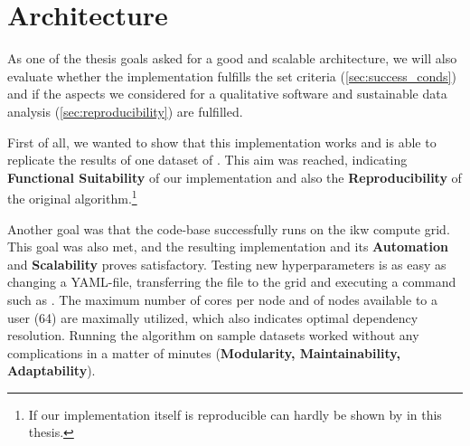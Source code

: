












\section{Architecture}

As one of the thesis goals asked for a good and scalable architecture, we will also evaluate whether the implementation fulfills the set criteria (\autoref{sec:success_conds}) and if the aspects we considered for a qualitative software and sustainable data analysis (\autoref{sec:reproducibility}) are fulfilled.

First of all, we wanted to show that this implementation works and is able to replicate the results of one dataset of \mainalgos. This aim was reached, indicating \textbf{Functional Suitability} of our implementation and also the \textbf{Reproducibility} of the original algorithm.\footnote{If our implementation itself is reproducible can hardly be shown by \me in this thesis.}

Another goal was that the code-base successfully runs on the \gls{ikw} compute grid. This goal was also met, and the resulting implementation and its \textbf{Automation} and \textbf{Scalability} proves satisfactory. Testing new hyperparameters is as easy as changing a YAML-file, transferring the file to the grid and executing a command such as . The maximum number of cores per node and of nodes available to a user (64) are maximally utilized, which also indicates optimal dependency resolution. Running the algorithm on sample datasets worked without any complications in a matter of minutes (\textbf{Modularity, Maintainability, Adaptability}).

